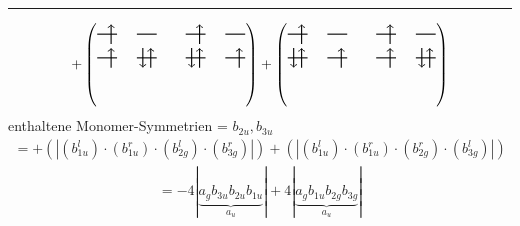 \documentclass{article}
\begin{document}
\hrule\newpage 
\[ +\left(\text{\begin{tikzpicture}
    \draw[thick] (0,0) -- (0.5,0); %
    \draw[thick] (1,0) -- (1.5,0); %
    \draw[thick] (0,-0.6) -- (0.5,-0.6); %
    \draw[thick] (1,-0.6) -- (1.5,-0.6); %
\draw[->, thick] (0.35, -0.25) -- (0.35, 0.25); 
\draw[-> , thick] (0.35, -0.85) -- (0.35, -0.35); 
 \draw[-> , thick] (1.35, -0.85) -- (1.35, -0.35); 
\draw[<- , thick] (1.15, -0.85) -- (1.15, -0.35); 
\end{tikzpicture}\qquad \begin{tikzpicture}
    \draw[thick] (0,0) -- (0.5,0); %
    \draw[thick] (1,0) -- (1.5,0); %
    \draw[thick] (0,-0.6) -- (0.5,-0.6); %
    \draw[thick] (1,-0.6) -- (1.5,-0.6); %
\draw[->, thick] (0.35, -0.25) -- (0.35, 0.25); 
\draw[-> , thick] (0.35, -0.85) -- (0.35, -0.35); 
\draw[<- , thick] (0.15, -0.85) -- (0.15, -0.35); 
 \draw[-> , thick] (1.35, -0.85) -- (1.35, -0.35); 
\end{tikzpicture}}\right)+\left(\text{\begin{tikzpicture}
    \draw[thick] (0,0) -- (0.5,0); %
    \draw[thick] (1,0) -- (1.5,0); %
    \draw[thick] (0,-0.6) -- (0.5,-0.6); %
    \draw[thick] (1,-0.6) -- (1.5,-0.6); %
\draw[->, thick] (0.35, -0.25) -- (0.35, 0.25); 
\draw[-> , thick] (0.35, -0.85) -- (0.35, -0.35); 
\draw[<- , thick] (0.15, -0.85) -- (0.15, -0.35); 
 \draw[-> , thick] (1.35, -0.85) -- (1.35, -0.35); 
\end{tikzpicture}\qquad \begin{tikzpicture}
    \draw[thick] (0,0) -- (0.5,0); %
    \draw[thick] (1,0) -- (1.5,0); %
    \draw[thick] (0,-0.6) -- (0.5,-0.6); %
    \draw[thick] (1,-0.6) -- (1.5,-0.6); %
\draw[->, thick] (0.35, -0.25) -- (0.35, 0.25); 
\draw[-> , thick] (0.35, -0.85) -- (0.35, -0.35); 
 \draw[-> , thick] (1.35, -0.85) -- (1.35, -0.35); 
\draw[<- , thick] (1.15, -0.85) -- (1.15, -0.35); 
\end{tikzpicture}}\right)\]enthaltene Monomer-Symmetrien = $b_{2u},b_{3u}$\begin{multline*}=+\left(\left|(b_{1u}^{l}) \cdot (b_{1u}^{r}) \cdot (b_{2g}^{l}) \cdot (b_{3g}^{r})\right|\right)+\left(\left|(b_{1u}^{l}) \cdot (b_{1u}^{r}) \cdot (b_{2g}^{r}) \cdot (b_{3g}^{l})\right|\right)\end{multline*}
\begin{multline*}
=-4\left|\underbrace{a_{g} b_{3u} b_{2u} b_{1u}}_{a_{u}}\right|+4\left|\underbrace{a_{g} b_{1u} b_{2g} b_{3g}}_{a_{u}}\right|
\end{multline*}
\\\\
\end{document}
